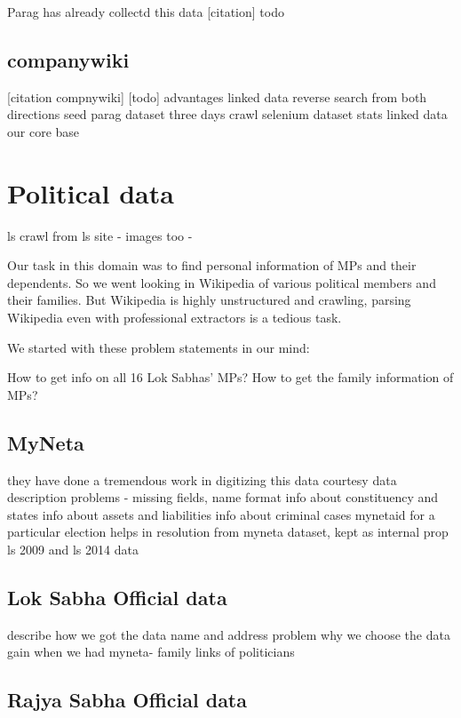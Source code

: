 Parag has already collectd this data [citation] todo



\subsection{companywiki}
[citation compnywiki]
[todo]
advantages
linked data
reverse search from both directions
seed parag dataset
three days crawl selenium
dataset stats
linked data
our core base


\section{Political data}

ls crawl from ls site - images too - 

Our task in this domain was to find personal information of MPs and their dependents. So we went looking in Wikipedia of various political members and their families. But Wikipedia is highly unstructured and crawling, parsing Wikipedia even with professional extractors is a tedious task.

We started with these problem statements in our mind:

How to get info on all 16 Lok Sabhas’ MPs?
How to get the family information of MPs?

\subsection{MyNeta}

they have done a tremendous work in digitizing this data
courtesy
data description
problems -  missing fields, name format
info about constituency and states 
info about assets and liabilities
info about criminal cases
mynetaid for a particular election helps in resolution from myneta dataset, kept as internal prop
ls 2009 and ls 2014 data

\subsection{Lok Sabha Official data}

describe how we got the data
name and address problem
why we choose the data gain when we had myneta- family links of politicians


\subsection{Rajya Sabha Official data}

